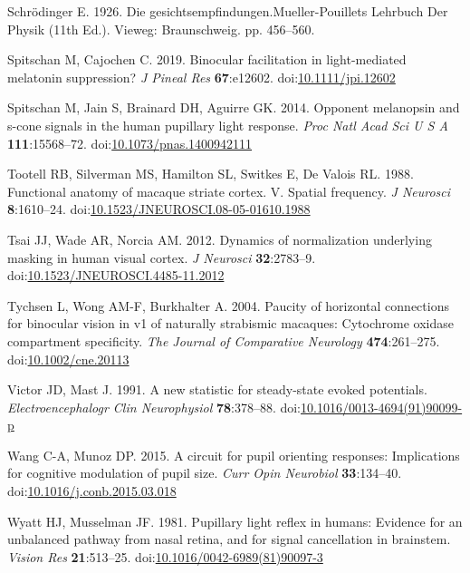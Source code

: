 \documentclass[
]{article}
\begin{document}
\leavevmode\hypertarget{ref-Schrodinger1926}{}%
Schrödinger E. 1926. Die gesichtsempfindungen.Mueller-Pouillets Lehrbuch Der Physik (11th Ed.). Vieweg: Braunschweig. pp. 456--560.

\leavevmode\hypertarget{ref-Spitschan2019}{}%
Spitschan M, Cajochen C. 2019. Binocular facilitation in light-mediated melatonin suppression? \emph{J Pineal Res} \textbf{67}:e12602. doi:\href{https://doi.org/10.1111/jpi.12602}{10.1111/jpi.12602}

\leavevmode\hypertarget{ref-Spitschan2014}{}%
Spitschan M, Jain S, Brainard DH, Aguirre GK. 2014. Opponent melanopsin and s-cone signals in the human pupillary light response. \emph{Proc Natl Acad Sci U S A} \textbf{111}:15568--72. doi:\href{https://doi.org/10.1073/pnas.1400942111}{10.1073/pnas.1400942111}

\leavevmode\hypertarget{ref-Tootell1988}{}%
Tootell RB, Silverman MS, Hamilton SL, Switkes E, De Valois RL. 1988. Functional anatomy of macaque striate cortex. V. Spatial frequency. \emph{J Neurosci} \textbf{8}:1610--24. doi:\href{https://doi.org/10.1523/JNEUROSCI.08-05-01610.1988}{10.1523/JNEUROSCI.08-05-01610.1988}

\leavevmode\hypertarget{ref-Tsai2012}{}%
Tsai JJ, Wade AR, Norcia AM. 2012. Dynamics of normalization underlying masking in human visual cortex. \emph{J Neurosci} \textbf{32}:2783--9. doi:\href{https://doi.org/10.1523/JNEUROSCI.4485-11.2012}{10.1523/JNEUROSCI.4485-11.2012}

\leavevmode\hypertarget{ref-Tychsen2004}{}%
Tychsen L, Wong AM-F, Burkhalter A. 2004. Paucity of horizontal connections for binocular vision in v1 of naturally strabismic macaques: Cytochrome oxidase compartment specificity. \emph{The Journal of Comparative Neurology} \textbf{474}:261--275. doi:\href{https://doi.org/10.1002/cne.20113}{10.1002/cne.20113}

\leavevmode\hypertarget{ref-Victor1991}{}%
Victor JD, Mast J. 1991. A new statistic for steady-state evoked potentials. \emph{Electroencephalogr Clin Neurophysiol} \textbf{78}:378--88. doi:\href{https://doi.org/10.1016/0013-4694(91)90099-p}{10.1016/0013-4694(91)90099-p}

\leavevmode\hypertarget{ref-Wang2015}{}%
Wang C-A, Munoz DP. 2015. A circuit for pupil orienting responses: Implications for cognitive modulation of pupil size. \emph{Curr Opin Neurobiol} \textbf{33}:134--40. doi:\href{https://doi.org/10.1016/j.conb.2015.03.018}{10.1016/j.conb.2015.03.018}

\leavevmode\hypertarget{ref-Wyatt1981}{}%
Wyatt HJ, Musselman JF. 1981. Pupillary light reflex in humans: Evidence for an unbalanced pathway from nasal retina, and for signal cancellation in brainstem. \emph{Vision Res} \textbf{21}:513--25. doi:\href{https://doi.org/10.1016/0042-6989(81)90097-3}{10.1016/0042-6989(81)90097-3}
\end{document}
